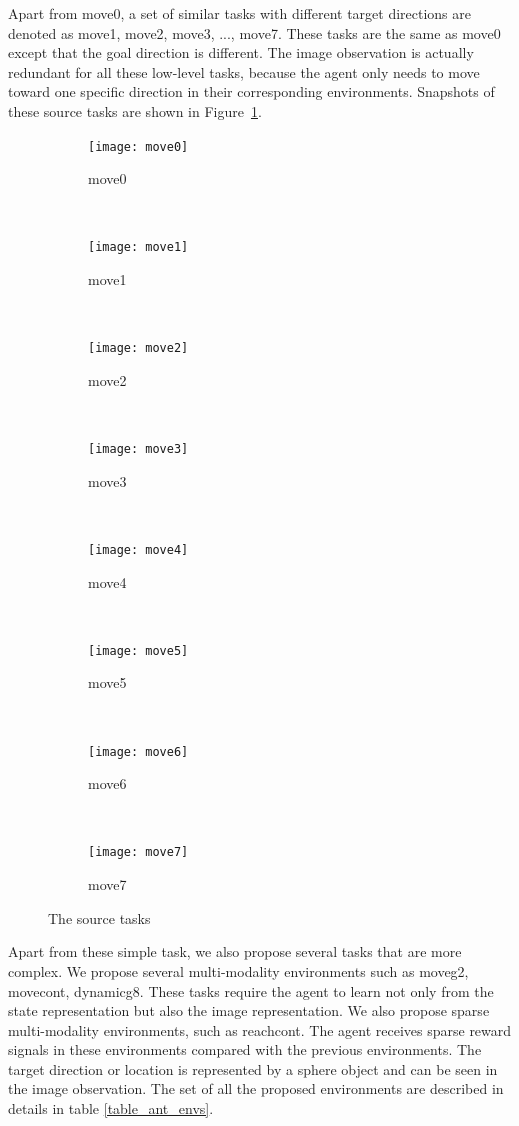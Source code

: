 Apart from move0, a set of similar tasks with different target directions are denoted as move1, move2, move3, ..., move7. These tasks are the same as move0 except that the goal direction is different. The image observation is actually redundant for all these low-level tasks, because the agent only needs to move toward one specific direction in their corresponding environments. Snapshots of these source tasks are shown in Figure~\ref{fig:task8}.
\begin{figure}[!htbp]
	\centering
	\begin{subfigure}[t]{0.3\textwidth}
		\centering
		\texttt{[image: move0]}
		\caption{move0}
	\end{subfigure}%
	~ 
	\begin{subfigure}[t]{0.3\textwidth}
		\centering
		\texttt{[image: move1]}
		\caption{move1}
	\end{subfigure}
	~ 
	\begin{subfigure}[t]{0.3\textwidth}
		\centering
		\texttt{[image: move2]}
		\caption{move2}
	\end{subfigure}
	~ 
	\begin{subfigure}[t]{0.3\textwidth}
		\centering
		\texttt{[image: move3]}
		\caption{move3}
	\end{subfigure}
	~ 
	\begin{subfigure}[t]{0.3\textwidth}
		\centering
		\texttt{[image: move4]}
		\caption{move4}
	\end{subfigure}
	~ 
	\begin{subfigure}[t]{0.3\textwidth}
		\centering
		\texttt{[image: move5]}
		\caption{move5}
	\end{subfigure}
	~ 
	\begin{subfigure}[t]{0.3\textwidth}
		\centering
		\texttt{[image: move6]}
		\caption{move6}
	\end{subfigure}
	~ 
	\begin{subfigure}[t]{0.3\textwidth}
		\centering
		\texttt{[image: move7]}
		\caption{move7}
	\end{subfigure}

	\caption{The source tasks}
	\label{fig:task8}
\end{figure}

Apart from these simple task, we also propose several tasks that are more complex. We propose several multi-modality environments such as moveg2, movecont, dynamicg8. These tasks require the agent to learn not only from the state representation but also the image representation. We also propose sparse multi-modality environments, such as reachcont. The agent receives sparse reward signals in these environments compared with the previous environments. The target direction or location is represented by a sphere object and can be seen in the image observation.
The set of all the proposed environments are described in details in table \ref{table_ant_envs}.


